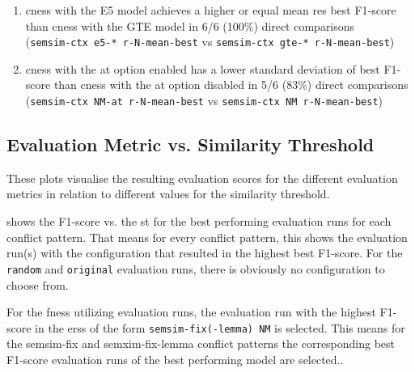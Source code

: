 \documentclass[11pt]{scrreprt}
\newcounter{listcounter}
\begin{document}
{\begin{enumerate}[label=\arabic{listcounter}.\arabic*]
	\item \gls{cness} with the E5 model achieves a higher or equal mean \gls{res} best F1-score than \gls{cness} with the GTE model in 6/6 (100\%) direct comparisons \\ (\texttt{semsim-ctx e5-* r-N-mean-best} vs \texttt{semsim-ctx gte-* r-N-mean-best}) \label{obs-itm:cness-e5-better-than-gte}
	\item \gls{cness} with the \gls{at} option enabled has a lower standard deviation of best F1-score than \gls{cness} with the \gls{at} option disabled in 5/6 (83\%) direct comparisons \\ (\texttt{semsim-ctx NM-at r-N-mean-best} vs \texttt{semsim-ctx NM r-N-mean-best}) \label{obs-itm:cness-lower-variation-with-at}
\end{enumerate}


\subsection{Evaluation Metric vs. Similarity Threshold}
\label{sec:eval-metrics-vs-st}

These plots visualise the resulting evaluation scores for the different evaluation metrics in relation to different values for the similarity threshold. 

 shows the F1-score vs. the \gls{st} for the best performing evaluation runs for each conflict pattern. That means for every conflict pattern, this shows the evaluation run(s) with the configuration that resulted in the highest best F1-score. For the \texttt{random} and \texttt{original} evaluation runs, there is obviously no configuration to choose from. 

For the \gls{fness} utilizing evaluation runs, the evaluation run with the highest F1-score in the \gls{ers}s of the form \texttt{semsim-fix(-lemma) NM} is selected. This means for the semsim-fix and semxim-fix-lemma conflict patterns the corresponding best F1-score evaluation runs of the best performing model are selected..

}
\end{document}
